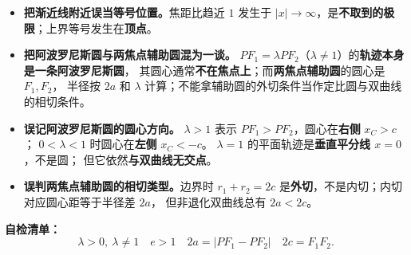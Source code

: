 \begin{trapbox}
\begin{itemize}
\item \textbf{把渐近线附近误当等号位置。}焦距比趋近 $1$ 发生于
$|x|\to\infty$，是\textbf{不取到的极限}；上界等号发生在\textbf{顶点}。

\item \textbf{把阿波罗尼斯圆与两焦点辅助圆混为一谈。}
$PF_1=\lambda PF_2$（$\lambda\ne1$）的\textbf{轨迹本身是一条阿波罗尼斯圆}，
其圆心通常\textbf{不在焦点上}；而\textbf{两焦点辅助圆}的圆心是 $F_1,F_2$，
半径按 $2a$ 和 $\lambda$ 计算；不能拿辅助圆的外切条件当作定比圆与双曲线的相切条件。

\item \textbf{误记阿波罗尼斯圆的圆心方向。}
$\lambda>1$ 表示 $PF_1>PF_2$，圆心在\textbf{右侧} $x_C>c$；
$0<\lambda<1$ 时圆心在\textbf{左侧} $x_C<-c$。
$\lambda=1$ 的平面轨迹是\textbf{垂直平分线 $x=0$}，不是圆；
但它依然\textbf{与双曲线无交点}。

\item \textbf{误判两焦点辅助圆的相切类型。}边界时
$r_1+r_2=2c$ 是\textbf{外切}，不是内切；内切对应圆心距等于半径差 $2a$，
但非退化双曲线总有 $2a<2c$。
\end{itemize}

\textbf{自检清单：}
\[
\boxed{\lambda>0,\ \lambda\ne1}\quad
\boxed{e>1}\quad
\boxed{2a=|PF_1-PF_2|}\quad
\boxed{2c=F_1F_2}.
\]
\end{trapbox}
